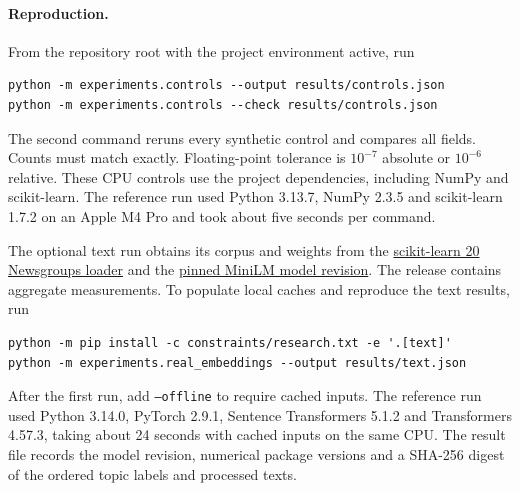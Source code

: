 \paragraph{Reproduction.}
From the repository root with the project environment active, run
\begin{verbatim}
python -m experiments.controls --output results/controls.json
python -m experiments.controls --check results/controls.json
\end{verbatim}
The second command reruns every synthetic control and compares all fields.
Counts must match exactly. Floating-point tolerance is $10^{-7}$ absolute
or $10^{-6}$ relative. These CPU controls use the project dependencies,
including NumPy and scikit-learn. The reference run used Python 3.13.7,
NumPy 2.3.5 and scikit-learn 1.7.2 on an Apple M4 Pro and took about five
seconds per command.

The optional text run obtains its corpus and weights from the
\href{https://scikit-learn.org/stable/modules/generated/sklearn.datasets.fetch_20newsgroups.html}{scikit-learn 20 Newsgroups loader}
and the
\href{https://huggingface.co/sentence-transformers/all-MiniLM-L6-v2/tree/c9745ed1d9f207416be6d2e6f8de32d1f16199bf}{pinned MiniLM model revision}.
The release contains aggregate measurements. To populate local caches and
reproduce the text results, run
\begin{verbatim}
python -m pip install -c constraints/research.txt -e '.[text]'
python -m experiments.real_embeddings --output results/text.json
\end{verbatim}
After the first run, add \texttt{--offline} to require cached inputs.
The reference run used Python 3.14.0, PyTorch 2.9.1, Sentence Transformers
5.1.2 and Transformers 4.57.3, taking about 24 seconds with cached inputs on
the same CPU. The result file records the model revision, numerical package
versions and a SHA-256 digest of the ordered topic labels and processed texts.
